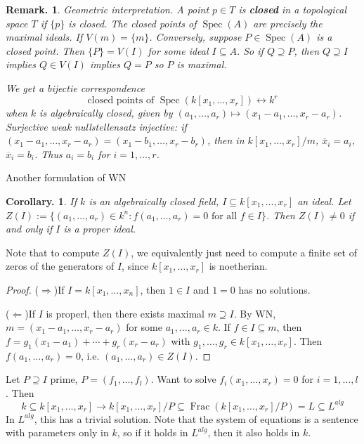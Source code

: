 \documentclass[11pt, a4paper]{memoir}
\newcommand{\impr}{{($\Rightarrow$)\hspace{0.2cm}}}
\newcommand{\impl}{{($\Leftarrow$)\hspace{0.2cm}}}
\newcommand{\ol}[1]{\ensuremath{\overline{#1}}}
\theoremstyle{change}
\newtheorem{corollary}[theorem]{Corollary.}
\theoremstyle{plain}
\theoremstyle{nonumberplain}
\newtheorem{remark}{Remark.}
\newtheorem{proof}{Proof}
\DeclareMathOperator{\Frac}{Frac}
\DeclareMathOperator{\Spec}{Spec}
\numberwithin{equation}{section}
\begin{document}
\begin{remark}
    Geometric interpretation.
    A point $p\in T$ is \textbf{closed} in a topological space $T$ if $\{p\}$ is closed.
    The closed points of $\Spec(A)$ are precisely the maximal ideals.
    If $V(m)=\{m\}$.
    Conversely, suppose $P\in\Spec(A)$ is a closed point.
    Then $\{P\}=V(I)$ for some ideal $I\subseteq A$.
    So if $Q\supseteq P$, then $Q\supseteq I$ implies $Q\in V(I)$ implies $Q=P$ so $P$ is maximal.

    We get a bijectie correspondence
    \begin{equation*}
        \text{closed points of }\Spec(k[x_1,\ldots,x_r])\leftrightarrow k^r
    \end{equation*}
    when $k$ is algebraically closed, given by $(a_1,\ldots,a_r)\mapsto(x_1-a_1,\ldots,x_r-a_r)$.
    Surjective weak nullstellensatz
    injective: if $(x_1-a_1,\ldots,x_r-a_r)=(x_1-b_1,\ldots,x_r-b_r)$, then in $k[x_1,\ldots,x_r]/m$, $\ol{x}_i=a_i$, $\ol{x}_i=b_i$.
    Thus $a_i=b_i$ for $i=1,\ldots,r$.
\end{remark}
Another formulation of WN
\begin{corollary}
    If $k$ is an algebraically closed field, $I\subseteq k[x_1,\ldots,x_r]$ an ideal.
    Let $Z(I):=\{(a_1,\ldots,a_r)\in k^n:f(a_1,\ldots,a_r)=0\text{ for all $f\in I$}\}$.
    Then $Z(I)\neq 0$ if and only if $I$ is a proper ideal.
\end{corollary}
Note that to compute $Z(I)$, we equivalently just need to compute a finite set of zeros of the generators of $I$, since $k[x_1,\ldots,x_r]$ is noetherian.
\begin{proof}
    \impr If $I=k[x_1,\ldots,x_n]$, then $1\in I$ and $1=0$ has no solutions.

    \impl If $I$ is properl, then there exists maximal $m\supseteq I$.
    By WN, $m=(x_1-a_1,\ldots,x_r-a_r)$ for some $a_1,\ldots,a_r\in k$.
    If $f\in I\subseteq m$, then $f=g_1(x_1-a_1)+\cdots+g_r(x_r-a_r)$ with $g_1,\ldots,g_r\in k[x_1,\ldots,x_r]$.
    Then $f(a_1,\ldots,a_r)=0$, i.e. $(a_1,\ldots,a_r)\in Z(I)$.
\end{proof}
Let $P\supseteq I$ prime, $P=(f_1,\ldots,f_l)$.
Want to solve $f_i(x_1,\ldots,x_r)=0$ for $i=1,\ldots,l$.
Then
\begin{equation*}
    k\subseteq k[x_1,\ldots,x_r]\to k[x_1,\ldots,x_r]/P\subseteq\Frac(k[x_1,\ldots,x_r]/P)=L\subseteq L^{alg}
\end{equation*}
In $L^{alg}$, this has a trivial solution.
Note that the system of equations is a sentence with parameters only in $k$, so if it holds in $L^{alg}$, then it also holds in $k$.
\end{document}
